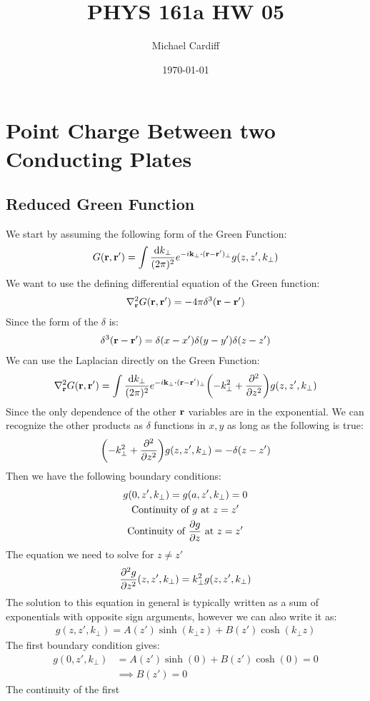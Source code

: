 \documentclass[12pt]{article}
\title{\vspace{-3em}PHYS 161a HW 05}
\author{Michael Cardiff}
\date{\today}
\begin{document}
\maketitle

\section{Point Charge Between two Conducting Plates}
\subsection{Reduced Green Function}
We start by assuming the following form of the Green Function:
\begin{align*}
  G(\vb{r,r}')=\int\frac{\dd{k_{\perp}}}{(2\pi)^2}
  e^{-i\vb{k}_\perp\vdot(\vb{r-r}')_\perp}g(z,z',k_\perp)
\end{align*}
We want to use the defining differential equation of the Green function:
\begin{align*}
  \laplacian_{\vb{r}}G(\vb{r,r}')=-4\pi\delta^3\qty(\vb{r-r}')
\end{align*}
Since the form of the $\delta$ is:
\begin{align*}
  \delta^3\qty(\vb{r-r}')=\delta(x-x')\delta(y-y')\delta(z-z')
\end{align*}
We can use the Laplacian directly on the Green Function:
\begin{align*}
  \laplacian_{\vb{r}}G(\vb{r,r}')=\int\frac{\dd{k_{\perp}}}{(2\pi)^2}
  e^{-i\vb{k}_\perp\vdot(\vb{r-r}')_\perp}\qty(-k_\perp^2+\pdv[2]{z})g(z,z',k_\perp)
\end{align*}
Since the only dependence of the other $\vb{r}$ variables are in the exponential. We can recognize the other products as $\delta$ functions in $x,y$ as long as the following is true:
\begin{align*}
  \qty(-k_\perp^2+\pdv[2]{z})g(z,z',k_\perp)=-\delta(z-z')
\end{align*}
Then we have the following boundary conditions:
\begin{gather*}
  g(0,z',k_\perp)=g(a,z',k_\perp)=0\\
  \text{Continuity of $g$ at $z=z'$}\\
  \text{Continuity of $\pdv{g}{z}$ at $z=z'$}
\end{gather*}
The equation we need to solve for $z\neq z'$
\begin{align*}
  \pdv[2]{g}{z}\qty(z,z',k_\perp) =k_\perp^2g(z,z',k_\perp)
\end{align*}
The solution to this equation in general is typically written as a sum of exponentials with opposite sign arguments, however we can also write it as:
\begin{align*}
  g(z,z',k_\perp)=A(z')\sinh(k_\perp z)+B(z')\cosh(k_\perp z)
\end{align*}
The first boundary condition gives:
\begin{align*}
  g(0,z',k_\perp)&=A(z')\sinh(0)+B(z')\cosh(0)=0\\
  &\implies B(z')=0
\end{align*}
The continuity of the first 
\end{document}
